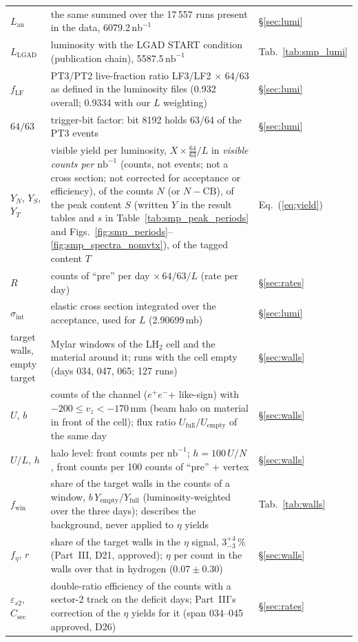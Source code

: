 \documentclass[11pt,a4paper]{article}
\newcommand{\ee}{\ensuremath{e^{+}e^{-}}\xspace}
\newcommand{\nbinv}{\ensuremath{\mathrm{nb}^{-1}}\xspace}
\newcommand{\Lan}{\ensuremath{L_{\mathrm{an}}}\xspace}
\newcommand{\vz}{\ensuremath{v_z}\xspace}
\newcommand{\fwin}{\ensuremath{f_{\mathrm{win}}}\xspace}
\newcommand{\feta}{\ensuremath{f_\eta}\xspace}
\begin{document}
{\begin{longtable}{@{}>{\raggedright\arraybackslash}p{3.0cm} >{\raggedright\arraybackslash}p{\dimexpr\textwidth-3.0cm-2.2cm-4\tabcolsep\relax} >{\raggedright\arraybackslash}p{2.2cm}@{}}
\Lan & the same summed over the 17\,557 runs present in the data, 6079.2\,\nbinv & \S\ref{sec:lumi} \\
$L_{\mathrm{LGAD}}$ & luminosity with the LGAD START condition (publication chain), 5587.5\,\nbinv & Tab.~\ref{tab:smp_lumi} \\
$f_{\mathrm{LF}}$ & PT3/PT2 live-fraction ratio LF3/LF2$\,\times\,64/63$ as defined in the luminosity files (0.932 overall; 0.9334 with our $L$ weighting) & \S\ref{sec:lumi} \\
$64/63$ & trigger-bit factor: bit 8192 holds 63/64 of the PT3 events & \S\ref{sec:lumi} \\
$Y_N$, $Y_S$, $Y_T$ & visible yield per luminosity, $X\times\frac{64}{63}/L$ in \emph{visible counts per \nbinv} (counts, not events; not a cross section; not corrected for acceptance or efficiency), of the counts $N$ (or $N-\mathrm{CB}$), of the peak content $S$ (written $Y$ in the result tables and $s$ in Table~\ref{tab:smp_peak_periods} and Figs.~\ref{fig:smp_periods}--\ref{fig:smp_spectra_nomvtx}), of the tagged content $T$ & Eq.~(\ref{eq:yield}) \\
$R$ & counts of ``pre'' per day $\times\,64/63/L$ (rate per day) & \S\ref{sec:rates} \\
$\sigma_{\mathrm{int}}$ & elastic cross section integrated over the acceptance, used for $L$ (2.90699\,mb) & \S\ref{sec:lumi} \\
target walls, empty target & Mylar windows of the LH$_2$ cell and the material around it; runs with the cell empty (days 034, 047, 065; 127 runs) & \S\ref{sec:walls} \\
$U$, $b$ & counts of the channel (\ee + like-sign) with $-200\le\vz<-170$\,mm (beam halo on material in front of the cell); flux ratio $U_{\mathrm{full}}/U_{\mathrm{empty}}$ of the same day & \S\ref{sec:walls} \\
$U/L$, $h$ & halo level: front counts per \nbinv; $h=100\,U/N$, front counts per 100 counts of ``pre'' + vertex & \S\ref{sec:walls} \\
\fwin & share of the target walls in the counts of a window, $b\,Y_{\mathrm{empty}}/Y_{\mathrm{full}}$ (luminosity-weighted over the three days); describes the background, never applied to $\eta$ yields & Tab.~\ref{tab:walls} \\
\feta, $r$ & share of the target walls in the $\eta$ signal, $3^{+4}_{-3}$\,\% (Part~III, D21, approved); $\eta$ per count in the walls over that in hydrogen ($0.07\pm0.30$) & \S\ref{sec:walls} \\
$\varepsilon_{s2}$, $C_{\mathrm{sec}}$ & double-ratio efficiency of the counts with a sector-2 track on the deficit days; Part~III's correction of the $\eta$ yields for it (span 034--045 approved, D26) & \S\ref{sec:rates} \\

\end{longtable}}
\end{document}
